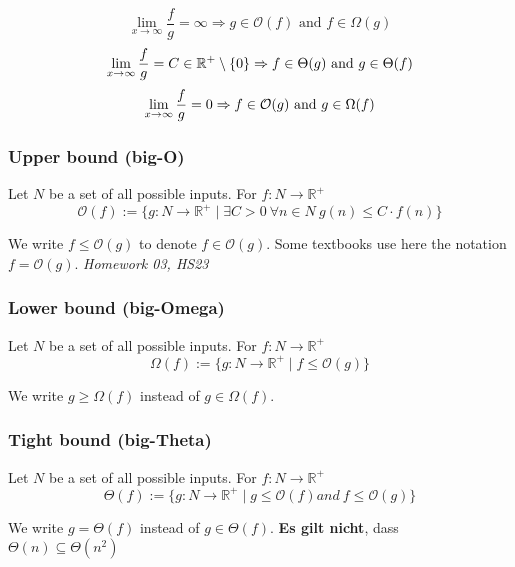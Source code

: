 \documentclass[a4paper]{article}
\begin{document}
    \begin{equation*}
    \lim_{x\to\infty}\frac fg = \infty \Rightarrow g \in \mathcal{O}(f) \text{ and } f \in \Omega(g)
    \end{equation*}
    \begin{equation*}
    \lim_{x \rightarrow \infty} \frac fg = C \in \mathbb{R}^+ \setminus \left\lbrace 0 \right\rbrace \Rightarrow f \in\Theta(g)  \text{ and } g \in\Theta(f) \\
    \end{equation*}
    \begin{equation*}
    \lim_{x \rightarrow \infty} \frac fg = 0 \Rightarrow f \in\mathcal{O}(g) \text{ and } g \in\Omega(f) \\
    \end{equation*}
    
    \subsubsection*{Upper bound (big-O)}
    Let ${N}$ be a set of all possible inputs. For $f: N \to \mathbb{R}^+$
    $$\mathcal{O}(f) :=\lbrace g: {N}\to\mathbb{R}^+\mid\exists C > 0 \ \forall n \in {N} \ g(n) \leq C \cdot f(n)\rbrace$$
    
    We write $f \leq \mathcal{O}(g)$ to denote $f \in \mathcal{O}(g)$. Some textbooks use here the notation $f = \mathcal{O}(g)$. \textit{Homework 03, HS23}
    
    \subsubsection*{Lower bound (big-Omega)}
    Let ${N}$ be a set of all possible inputs. For $f: N \to \mathbb{R}^+$
    $$\Omega(f) :=\lbrace g: {N} \to \mathbb{R}^+ \mid f \leq \mathcal{O}(g)\rbrace$$
    
    We write $g \geq \Omega(f)$ instead of $g \in \Omega(f)$.
    
    \subsubsection*{Tight bound (big-Theta)}
    Let ${N}$ be a set of all possible inputs. For $f: N \to \mathbb{R}^+$
    $$\Theta(f) :=\lbrace g: {N}\to\mathbb{R}^+\mid g \leq \mathcal{O}(f) and \ f \leq \mathcal{O}(g)\rbrace$$
    
    We write $g = \Theta(f)$ instead of $g \in \Theta(f)$.
    \textbf{Es gilt nicht}, dass $\Theta(n) \subseteq \Theta(n^2)$
    
\end{document}
